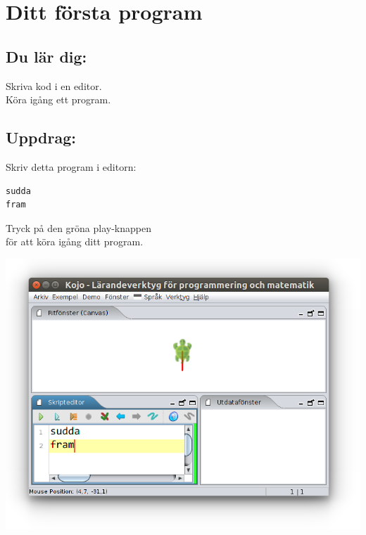 \chapter{Ditt första program}
\begin{multicols}{2}
\section*{\color{MidnightBlue}Du lär dig:}
Skriva kod i en editor.\\
Köra igång ett program.
\section*{\color{MidnightBlue}Uppdrag:}
Skriv detta program i editorn:

\begin{lstlisting}[basicstyle={\ttfamily\fontsize{24}{24}\selectfont}]
sudda
fram
\end{lstlisting}
    
Tryck på den gröna play-knappen\\
för att köra igång ditt program.

\columnbreak

\includegraphics[width=14cm]{../img/fram.png}
\end{multicols}

